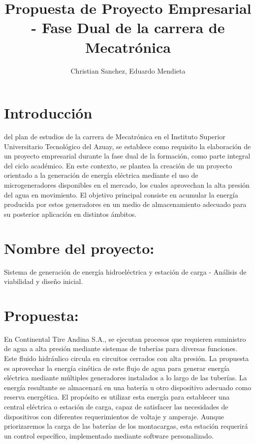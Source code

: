\documentclass[journal]{IEEEtran}
\begin{document}
\title{Propuesta de Proyecto Empresarial - Fase Dual de la carrera de Mecatrónica}

\author{Christian Sanchez, Eduardo Mendieta}

\maketitle

\IEEEpeerreviewmaketitle

\section{Introducción}

 del plan de estudios de la carrera de Mecatrónica en el Instituto Superior Universitario Tecnológico del Azuay, se establece como requisito la elaboración de un proyecto empresarial durante la fase dual de la formación, como parte integral del ciclo académico. En este contexto, se plantea la creación de un proyecto orientado a la generación de energía eléctrica mediante el uso de microgeneradores disponibles en el mercado, los cuales aprovechan la alta presión del agua en movimiento. El objetivo principal consiste en acumular la energía producida por estos generadores en un medio de almacenamiento adecuado para su posterior aplicación en distintos ámbitos.

\section{Nombre del proyecto:}

Sistema de generación de energía hidroeléctrica y estación de carga - Análisis de viabilidad y diseño inicial.

\section{Propuesta:}

En Continental Tire Andina S.A., se ejecutan procesos que requieren suministro de agua a alta presión mediante sistemas de tuberías para diversas funciones. Este fluido hidráulico circula en circuitos cerrados con alta presión. La propuesta es aprovechar la energía cinética de este flujo de agua para generar energía eléctrica mediante múltiples generadores instalados a lo largo de las tuberías. La energía resultante se almacenará en una batería u otro dispositivo adecuado como reserva energética. El propósito es utilizar esta energía para establecer una central eléctrica o estación de carga, capaz de satisfacer las necesidades de dispositivos con diferentes requerimientos de voltaje y amperaje. Aunque priorizaremos la carga de las baterías de los montacargas, esta estación requerirá un control específico, implementado mediante software personalizado.
\end{document}
